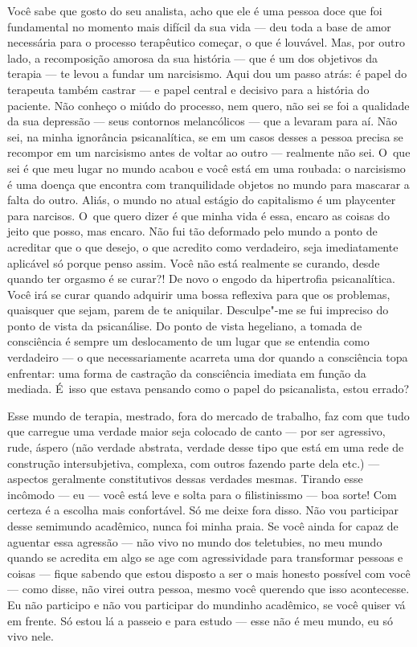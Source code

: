 Você sabe que gosto do seu analista, acho que ele é uma pessoa doce que
foi fundamental no momento mais difícil da sua vida --- deu toda a base
de amor necessária para o processo terapêutico começar, o que é
louvável. Mas, por outro lado, a recomposição amorosa da sua história
--- que é um dos objetivos da terapia --- te levou a fundar um
narcisismo. Aqui dou um passo atrás: é papel do terapeuta também castrar
--- e papel central e decisivo para a história do paciente. Não conheço
o miúdo do processo, nem quero, não sei se foi a qualidade da sua
depressão --- seus contornos melancólicos --- que a levaram para aí. Não
sei, na minha ignorância psicanalítica, se em um casos desses a pessoa
precisa se recompor em um narcisismo antes de voltar ao outro ---
realmente não sei. O~que sei é que meu lugar no mundo acabou e você está
em uma roubada: o narcisismo é uma doença que encontra com tranquilidade
objetos no mundo para mascarar a falta do outro. Aliás, o mundo no atual
estágio do capitalismo é um playcenter para narcisos. O~que quero dizer
é que minha vida é essa, encaro as coisas do jeito que posso, mas
encaro. Não fui tão deformado pelo mundo a ponto de acreditar que o que
desejo, o que acredito como verdadeiro, seja imediatamente aplicável só
porque penso assim. Você não está realmente se curando, desde quando ter
orgasmo é se curar?! De novo o engodo da hipertrofia psicanalítica. Você
irá se curar quando adquirir uma bossa reflexiva para que os problemas,
quaisquer que sejam, parem de te aniquilar. Desculpe"-me se fui impreciso
do ponto de vista da psicanálise. Do ponto de vista hegeliano, a tomada
de consciência é sempre um deslocamento de um lugar que se entendia como
verdadeiro --- o que necessariamente acarreta uma dor quando a
consciência topa enfrentar: uma forma de castração da consciência
imediata em função da mediada. É~isso que estava pensando como o papel
do psicanalista, estou errado?

Esse mundo de terapia, mestrado, fora do mercado de trabalho, faz com
que tudo que carregue uma verdade maior seja colocado de canto --- por
ser agressivo, rude, áspero (não verdade abstrata, verdade desse tipo
que está em uma rede de construção intersubjetiva, complexa, com outros
fazendo parte dela etc.) --- aspectos geralmente constitutivos dessas
verdades mesmas. Tirando esse incômodo --- eu --- você está leve e solta
para o filistinissmo --- boa sorte! Com certeza é a escolha mais
confortável. Só me deixe fora disso. Não vou participar desse semimundo
acadêmico, nunca foi minha praia. Se você ainda for capaz de aguentar
essa agressão --- não vivo no mundo dos teletubies, no meu mundo quando
se acredita em algo se age com agressividade para transformar pessoas e
coisas --- fique sabendo que estou disposto a ser o mais honesto
possível com você --- como disse, não virei outra pessoa, mesmo você
querendo que isso acontecesse. Eu não participo e não vou participar do
mundinho acadêmico, se você quiser vá em frente. Só estou lá a passeio e
para estudo --- esse não é meu mundo, eu só vivo nele.

